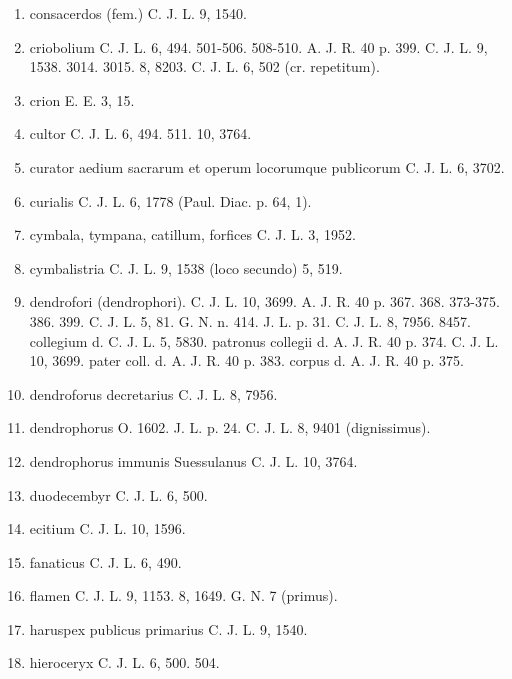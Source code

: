 \documentclass[a4paper, 11pt, oneside, polutonikogreek, german]{article}
\begin{document}
\begin{enumerate}
\item consacerdos (fem.) C. J. L. 9, 1540.

\item criobolium C. J. L. 6, 494. 501-506. 508-510. A. J. R. 40 p. 399. C. J. L. 9, 1538. 3014. 3015. 8, 8203. C. J. L. 6, 502 (cr. repetitum).

\item crion E. E. 3, 15.

\item cultor C. J. L. 6, 494. 511. 10, 3764.

\item curator aedium sacrarum et operum locorumque publicorum C. J. L. 6, 3702.

\item curialis C. J. L. 6, 1778 (Paul. Diac. p. 64, 1).

\item cymbala, tympana, catillum, forfices C. J. L. 3, 1952.

\item cymbalistria C. J. L. 9, 1538 (loco secundo) 5, 519.

\item dendrofori (dendrophori). C. J. L. 10, 3699. A. J. R. 40 p. 367. 368. 373-375. 386. 399. C. J. L. 5, 81. G. N. n. 414. J. L. p. 31. C. J. L. 8, 7956. 8457. collegium d. C. J. L. 5, 5830. patronus collegii d. A. J. R. 40 p. 374. C. J. L. 10, 3699. pater coll. d. A. J. R. 40 p. 383. corpus d. A. J. R. 40 p. 375.

\item dendroforus decretarius C. J. L. 8, 7956.

\item dendrophorus O. 1602. J. L. p. 24. C. J. L. 8, 9401 (dignissimus).

\item dendrophorus immunis Suessulanus C. J. L. 10, 3764.

\item duodecembyr C. J. L. 6, 500.

\item ecitium C. J. L. 10, 1596.

\item fanaticus C. J. L. 6, 490.

\item flamen C. J. L. 9, 1153. 8, 1649. G. N. 7 (primus).

\item haruspex publicus primarius C. J. L. 9, 1540.

\item hieroceryx C. J. L. 6, 500. 504.


\end{enumerate}
\end{document}
